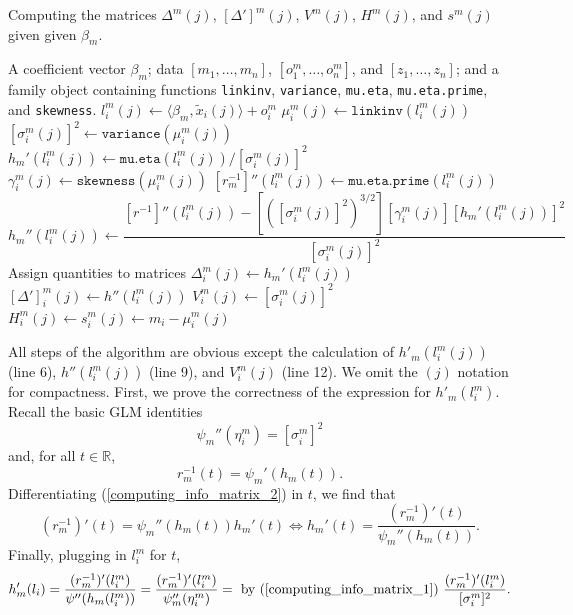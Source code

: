 \documentclass[12pt]{article}
\begin{document}
\begin{appendices}
\begin{refsection}
			\begin{algorithm}
			\caption{Computing the matrices $\Delta^m(j)$, $[\Delta']^m(j)$, $V^m(j)$, $H^m(j)$, and $s^m(j)$ given given $\beta_m$.}\label{algo:computing_info_matrices}
			\begin{algorithmic}[3]
				\Require A coefficient vector $\beta_m$; data $[m_1, \dots, m_n]$, $[o^m_1, \dots, o^m_n]$, and $[z_1, \dots, z_n]$; and a family object containing functions \texttt{linkinv}, \texttt{variance}, \texttt{mu.eta}, \texttt{mu.eta.prime}, and \texttt{skewness}.
				\State $l^m_i(j) \gets \langle \beta_m, \tilde{x}_i(j) \rangle + o^m_i$
				\State $\mu^m_i(j) \gets \texttt{linkinv}(l^m_i(j))$
				\State $[\sigma_i^m(j)]^2 \gets \texttt{variance}(\mu_i^m(j))$
				\State $h_m'(l_i^m(j)) \gets \texttt{mu.eta}(l_i^m(j))/[\sigma_i^m(j)]^2$
				\State $\gamma^m_i(j) \gets \texttt{skewness}(\mu^m_i(j))$
				\State $[r_m^{-1}]''(l_i^m(j)) \gets \texttt{mu.eta.prime}(l^m_i(j))$
				\State $$h_m''(l_i^m(j)) \gets \frac{[r^{-1}]''(l_i^m(j)) - [([\sigma_i^m(j)]^2)^{3/2}][\gamma^m_i(j)] [h_m'(l_i^m(j))]^2}{[\sigma_i^m(j)]^2}$$
				\Comment Assign quantities to matrices
				\State $\Delta_{i}^m(j) \gets h_m'( l_i^m(j))$
				\State $[\Delta']^m_{i}(j) \gets h''(l^m_i(j))$
				\State $V^m_{i}(j) \gets [\sigma^m_i(j)]^2$
				\State $H^m_{i}(j) \gets s^m_i(j) \gets m_i - \mu^m_i(j)$
				\EndFor
				\EndFor
			\end{algorithmic}
		\end{algorithm}
		
		All steps of the algorithm are obvious except the calculation of $h'_m(l^m_i(j))$ (line 6), $h''(l^m_i(j))$ (line 9), and $V^m_i(j)$ (line 12). We omit the $(j)$ notation for compactness. First, we prove the correctness of the expression for $h'_m(l^m_i)$. Recall the basic GLM identities
		\begin{equation}\label{computing_info_matrix_1}
		 \psi_m''(\eta_i^m) =  [\sigma^m_i]^2
		\end{equation}
		and, for all $t \in \mathbb{R}$, 
		\begin{equation}\label{computing_info_matrix_2}
		r_m^{-1}(t) = \psi_m'(h_m(t)).
		\end{equation}
		Differentiating (\ref{computing_info_matrix_2}) in $t$, we find that
		\begin{equation}\label{computing_info_matrix_3}
		(r_m^{-1})'(t) = \psi_m''(h_m(t))h_m'(t) \iff h_m'(t) = \frac{(r_m^{-1})'(t) }{\psi_m''(h_m(t))}.
		\end{equation}
	Finally, plugging in $l^m_i$ for $t$,
		$$ h_m'(l_i) = \frac{(r_m^{-1})'(l^m_i)}{\psi''(h_m(l^m_i))} = \frac{(r_m^{-1})'(l^m_i)}{\psi_m''(\eta^m_i)} = \textrm{ by (\ref{computing_info_matrix_1}) } \frac{(r_m^{-1})'(l_i^m)}{[\sigma_i^m]^2}.$$
		

\end{refsection}
\end{appendices}
\end{document}
